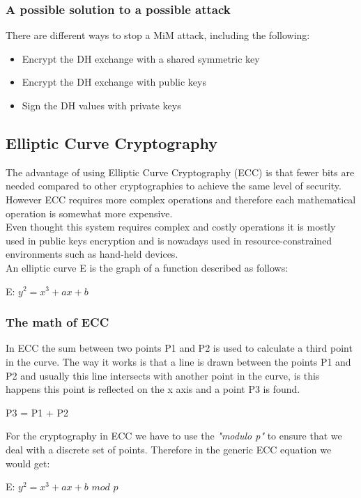 \documentclass{article}
\begin{document}
\subsubsection{A possible solution to a possible attack}
There are different ways to stop a MiM attack, including the following:
\begin{itemize}
    \item Encrypt the DH exchange with a shared symmetric key
    \item Encrypt the DH exchange with public keys
    \item Sign the DH values with private keys
\end{itemize}

\subsection{Elliptic Curve Cryptography}
The advantage of using Elliptic Curve Cryptography (ECC) is that fewer bits are needed compared to other cryptographies to achieve the same level of security. However ECC requires more complex operations and therefore each mathematical operation is somewhat more expensive.\\
Even thought this system requires complex and costly operations it is mostly used in public keys encryption and is nowadays used in resource-constrained environments such as hand-held devices.\\
An elliptic curve E is the graph of a function described as follows:
\begin{center}
    E: $y^2 = x^3 + ax + b$
\end{center}{}

\subsubsection{The math of ECC}
In ECC the sum between two points P1 and P2 is used to calculate a third point in the curve. The way it works is that a line is drawn between the points P1 and P2 and usually this line intersects with another point in the curve, is this happens this point is reflected on the x axis and a point P3 is found.
\begin{center}
    P3 = P1 + P2
\end{center}{}
For the cryptography in ECC we have to use the \textit{"modulo p"} to ensure that we deal with a discrete set of points. Therefore in the generic ECC equation we would get:
\begin{center}
    E: $y^2 = x^3 + ax + b$ $mod$ $p$
\end{center}{}
\end{document}
